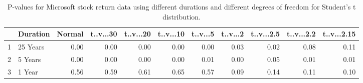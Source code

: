 \begin{table}[ht]
\centering
\caption{P-values for Microsoft stock return data using different durations
  and different degrees of freedom for Student's t distribution.} 
\label{table:microsoft}
\begin{tabular}{rlrrrrrrrrr}
  \hline
 & Duration & Normal & t..v...30 & t..v...20 & t..v...10 & t..v...5 & t..v...2 & t..v...2.5 & t..v...2.2 & t..v...2.15 \\ 
  \hline
1 & 25 Years & 0.00 & 0.00 & 0.00 & 0.00 & 0.00 & 0.03 & 0.02 & 0.08 & 0.11 \\ 
  2 & 5 Years & 0.00 & 0.00 & 0.00 & 0.00 & 0.01 & 0.00 & 0.05 & 0.01 & 0.01 \\ 
  3 & 1 Year & 0.56 & 0.59 & 0.61 & 0.65 & 0.57 & 0.09 & 0.14 & 0.11 & 0.10 \\ 
   \hline
\end{tabular}
\end{table}


